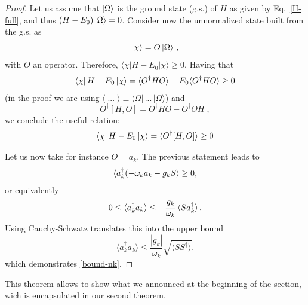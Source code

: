 \documentclass[notitlepage, prx, preprint, amsmath,superscriptaddress,amssymb]{revtex4-1}
\begin{document}
\begin{proof}
Let us assume that $\ket{\Omega}$ is the ground state (g.s.) of $H$ as given by Eq.\ \eqref{H-full}, and thus $(H-E_0)\ket{\Omega} = 0$.   Consider now the unnormalized state built from the g.s. as 
\begin{equation}
| \chi \rangle = O \ket{\Omega} \, ,
\end{equation}
with $O$ an operator.  Therefore, $\langle \chi | H - E_0 | \chi \rangle \geq 0$.   Having that
\begin{align}
\bra{\chi} H -E_0 \ket{\chi}  
= \langle O ^\dagger H O  \rangle  - E_0 
\langle  O ^\dagger H O  \rangle \geq 0 
\end{align}
(in the proof we are using $\langle \; ... \; \rangle \equiv \langle \Omega | \, ... \, | \Omega \rangle$)
and 
\begin{equation}
O^\dagger [H, O] = O^\dagger H O - O^\dagger O H \; ,
\end{equation}
we conclude the useful relation:
\begin{equation}
\bra{\chi} H -E_0 \ket{\chi}  
= \langle   O ^\dagger [H, O]  \rangle  \geq 0
\end{equation}


Let us now take for instance $O=a_k$. The previous statement leads to
\begin{align}
\braket{a_k^{\dagger} (-\omega_k a_k - g_k S }\geq 0,
\end{align}
or equivalently
\begin{equation}
0 \leq \braket{a_k^{\dagger}a_k} \leq -\frac{g_k}{\omega_k}\braket{ S a_k^{\dagger} }.
\end{equation}
Using Cauchy-Schwatz translates this into the upper bound
\begin{equation}
\langle a_k^\dagger a_k \rangle \leq \frac{|g_k|}{\omega_k} \sqrt{ \langle S S^\dagger \rangle}.
\end{equation}
which demonstrates \eqref{bound-nk}.
\end{proof}



This theorem allows to show what we announced at the beginning of the section, wich is encapsulated in our second theorem.
\end{document}
